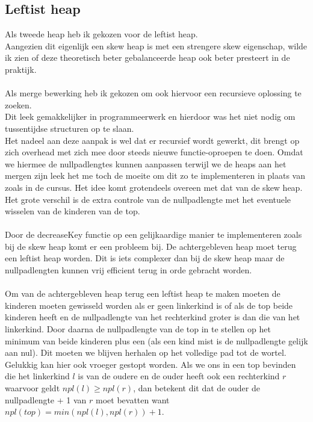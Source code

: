 \documentclass[10pt,a4paper,twoside]{article}
\begin{document}
\subsection{Leftist heap}
Als tweede heap heb ik gekozen voor de leftist heap.\\
Aangezien dit eigenlijk een skew heap is met een strengere skew eigenschap, wilde ik zien of deze theoretisch beter gebalanceerde heap ook beter presteert in de praktijk.
\\\\
Als merge bewerking heb ik gekozen om ook hiervoor een recursieve oplossing te zoeken.\\
Dit leek gemakkelijker in programmeerwerk en hierdoor was het niet nodig om tussentijdse structuren op te slaan.\\
Het nadeel aan deze aanpak is wel dat er recursief wordt gewerkt, dit brengt op zich overhead met zich mee door steeds nieuwe functie-oproepen te doen. Omdat we hiermee de nullpadlengtes kunnen aanpassen terwijl we de heaps aan het mergen zijn leek het me toch de moeite om dit zo te implementeren in plaats van zoals in de cursus. Het idee komt grotendeels overeen met dat van de skew heap. Het grote verschil is de extra controle van de nullpadlengte met het eventuele wisselen van de kinderen van de top.
\\\\
Door de {\selectfont decreaseKey} functie op een gelijkaardige manier te implementeren zoals bij de skew heap komt er een probleem bij. De achtergebleven heap moet terug een leftist heap worden. Dit is iets complexer dan bij de skew heap maar de nullpadlengten kunnen vrij efficient terug in orde gebracht worden\cite{decreaseKeyLeftist}.
\\\\
Om van de achtergebleven heap terug een leftist heap te maken moeten de kinderen moeten gewisseld worden als er geen linkerkind is of als de top beide kinderen heeft en de nullpadlengte van het rechterkind groter is dan die van het linkerkind. Door daarna de nullpadlengte van de top in te stellen op het minimum van beide kinderen plus een (als een kind mist is de nullpadlengte gelijk aan nul). Dit moeten we blijven herhalen op het volledige pad tot de wortel.\\
Gelukkig kan hier ook vroeger gestopt worden. Als we ons in een top bevinden die het linkerkind $l$ is van de oudere en de ouder heeft ook een rechterkind $r$ waarvoor geldt $npl(l)\geq npl(r)$, dan betekent dit dat de ouder de nullpadlengte + 1 van $r$ moet bevatten want $npl(top)=min(npl(l),npl(r))+1$.\\
\end{document}
